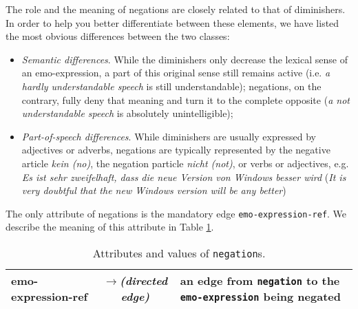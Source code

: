 \documentclass[11pt,a4paper]{article}
\newlength{\clmnwidth}
\theoremstyle{mytheoremstyle}
\begin{document}
The role and the meaning of negations are closely related to that of
diminishers.  In order to help you better differentiate between these
elements, we have listed the most obvious differences between the two
classes:
\begin{itemize}
  \item\textit{Semantic differences}.  While the diminishers only
    decrease the lexical sense of an emo-expression, a part of this
    original sense still remains active (i.e. \textit{a hardly
      understandable speech} is still understandable); negations, on
    the contrary, fully deny that meaning and turn it to the complete
    opposite (\textit{a not understandable speech} is absolutely
    unintelligible);

  \item\textit{Part-of-speech differences}.  While diminishers are
    usually expressed by adjectives or adverbs, negations are
    typically represented by the negative article \textit{kein (no)},
    the negation particle \textit{nicht (not)}, or verbs or
    adjectives, e.g.  \textit{Es ist sehr zweifelhaft, dass die neue
      Version von Windows besser wird} (\textit{It is very doubtful
      that the new Windows version will be any better})

\end{itemize}

The only attribute of negations is the mandatory edge
\texttt{emo-expression-ref}.  We describe the meaning of this
attribute in Table \ref{tbl:negation}.
\begin{center}
  \begin{table}
    \caption{Attributes and values of \texttt{negation}s.}
    \begin{tabular}{|l|c|p{0.875\clmnwidth}|}\hline
      emo-expression-ref & \textit{$\longrightarrow$\newline(directed
        edge)} & an edge from \texttt{negation} to the
      \texttt{emo-expression} being negated\\\hline
    \end{tabular}
    \label{tbl:negation}
  \end{table}
\end{center}
\end{document}
